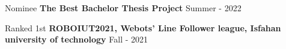 \begin{cventries}

    \cventry
    {Nominee}
    {\textbf {The Best Bachelor Thesis Project}}
    {}
    {Summer - 2022}
    {}
    \vspace{0.4 cm}

    \cventry
    {Ranked 1st}
    {\textbf {ROBOIUT2021, Webots’ Line Follower league, Isfahan university of technology}}
    {}
    {Fall - 2021}
    {}
\end{cventries}